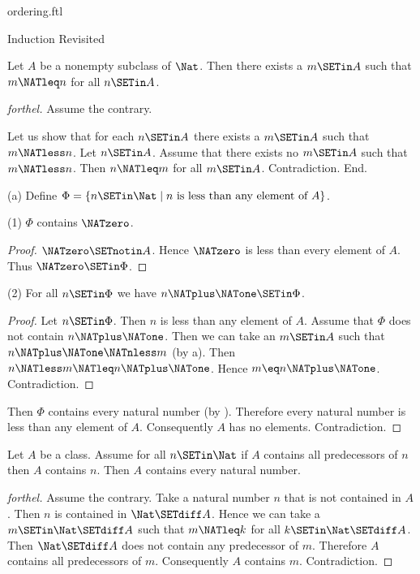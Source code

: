 \documentclass{naproche-library}
\begin{document}
\begin{smodule}[title=The Standard Ordering of the Natural Numbers]{ordering.ftl}
\begin{sfragment}{Induction Revisited}
  \begin{proposition}[forthel,id=ARITHMETIC_04_272317502455808]
    Let $A$ be a nonempty subclass of $\Nat$.
    Then there exists a $m \SETin A$ such that $m \NATleq n$ for all $n \SETin A$.
  \end{proposition}
  \begin{proof}[forthel]
    Assume the contrary.

    Let us show that for each $n \SETin A$ there exists a $m \SETin A$ such that $m \NATless n$.
      Let $n \SETin A$.
      Assume that there exists no $m \SETin A$ such that $m \NATless n$.
      Then $n \NATleq m$ for all $m \SETin A$.
      Contradiction.
    End.

    (a) Define $\Phi = \{ n \SETin \Nat \mid n\text{ is less than any element of }A \}$.

    (1) $\Phi$ contains $\NATzero$.
    \begin{proof}
      $\NATzero \SETnotin A$.
      Hence $\NATzero$ is less than every element of $A$.
      Thus $\NATzero \SETin \Phi$.
    \end{proof}

    (2) For all $n \SETin \Phi$ we have $n \NATplus \NATone \SETin \Phi$.
    \begin{proof}
      Let $n \SETin \Phi$.
      Then $n$ is less than any element of $A$.
      Assume that $\Phi$ does not contain $n \NATplus \NATone$.
      Then we can take an $m \SETin A$ such that $n \NATplus \NATone \NATnless m$ (by a).
      Then $n \NATless m \NATleq n \NATplus \NATone$.
      Hence $m \eq n \NATplus \NATone$.
      Contradiction.
    \end{proof}

    Then $\Phi$ contains every natural number (by ).
    Therefore every natural number is less than any element of $A$.
    Consequently $A$ has no elements.
    Contradiction.
  \end{proof}

  \begin{theorem}[forthel,id=ARITHMETIC_04_3609801697263616]
    Let $A$ be a class.
    Assume for all $n \SETin \Nat$ if $A$ contains all predecessors of $n$ then $A$ contains $n$.
    Then $A$ contains every natural number.
  \end{theorem}
  \begin{proof}[forthel]
    Assume the contrary.
    Take a natural number $n$ that is not contained in $A$.
    Then $n$ is contained in $\Nat \SETdiff A$.
    Hence we can take a $m \SETin \Nat \SETdiff A$ such that $m \NATleq k$ for all $k \SETin \Nat \SETdiff A$.
    Then $\Nat \SETdiff A$ does not contain any predecessor of $m$.
    Therefore $A$ contains all predecessors of $m$.
    Consequently $A$ contains $m$.
    Contradiction.
  \end{proof}


\end{sfragment}
\end{smodule}
\end{document}
